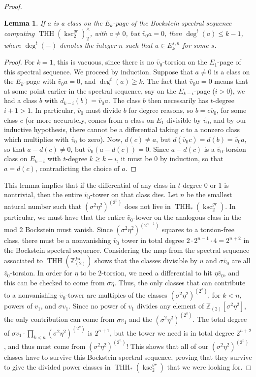 \documentclass[11pt,leqno]{article}
\newcommand{\zz}{\mathbb{Z}}
\DeclareMathOperator{\THH}{THH}
\DeclareMathOperator{\ksc}{ksc}
\newtheorem*{short hand}{theorem name}
\theoremstyle{plain}  %
\newtheorem{lemma}{Lemma}[section]
\theoremstyle{definition}
\numberwithin{equation}{section}
\begin{document}
\begin{proof}
\begin{lemma}\label{lem6.6}
If $a$ is a class on the $E_k$-page of the Bockstein spectral sequence computing $\THH(\ksc_2^{gr})_2^{\wedge}$, with $a\neq 0$, but $\tilde{v_0}a=0$, then $\deg^{t}(a)\leq k-1$, where $\deg^t(-)$ denotes the integer $n$ such that $a\in E_k^{s,n}$ for some $s$.
\end{lemma}
\begin{proof}  For $k=1$, this is vacuous, since there is no $\tilde{v_0}$-torsion on the $E_1$-page of this spectral sequence.  We proceed by induction.  Suppose that $a\neq 0$ is a class on the $E_k$-page with $\tilde{v_0}a=0$, and $\deg^{t}(a)\geq k$.  The fact that $\tilde{v_0}a=0$ means that at some point earlier in the spectral sequence, say on the $E_{k-i}$-page ($i>0$), we had a class $b$ with $d_{k-i}(b)=\tilde{v_0}a$.  The class $b$ then necessarily has $t$-degree $i+1>1$.  In particular, $\tilde{v_0}$ must divide $b$ for degree reasons, so $b=c\tilde{v_0}$, for some class $c$ (or more accurately, comes from a class on $E_1$ divisible by $\tilde{v_0}$, and by our inductive hypothesis, there cannot be a differential taking $c$ to a nonzero class which multiplies with $\tilde{v_0}$ to zero).  Now, $d(c)\neq a$, but $d(\tilde{v_0}c)=d(b)=\tilde{v_0}a$, so that $a-d(c)\neq 0$, but $\tilde{v_0}(a-d(c))=0$.  Since $a-d(c)$ is a $\tilde{v_0}$-torsion class on $E_{k-i}$ with $t$-degree $k\geq k-i$, it must be 0 by induction, so that $a=d(c)$, contradicting the choice of $a$.
\end{proof}
This lemma implies that if the differential of any class in $t$-degree $0$ or $1$ is nontrivial, then the entire $\tilde{v_0}$-tower on that class dies.  Let $n$ be the smallest natural number such that $(\sigma^2\eta^2)^{(2^n)}$ does not live in $\THH_*(\ksc_2^{gr})$.  In particular, we must have that the entire $\tilde{v_0}$-tower on the analogous class in the mod 2 Bockstein must vanish.  Since $(\sigma^2\eta^2)^{(2^{n-1})}$ squares to a torsion-free class, there must be a nonvanishing $\tilde{v_0}$ tower in total degree $2\cdot 2^{n-1}\cdot 4=2^{n+2}$ in the Bockstein spectral sequence.  Considering the map from the spectral sequence associated to $\THH(\zz_{(2)}^{fil})$ shows that the classes divisible by $u$ and $\sigma\tilde{v_0}$ are all $\tilde{v_0}$-torsion.  In order for $\eta$ to be $2$-torsion, we need a differential to hit $\eta\tilde{v_0}$, and this can be checked to come from $\sigma\eta$.  Thus, the only classes that can contribute to a nonvanishing $\tilde{v_0}$-tower are multiples of the classes $(\sigma^2\eta^2)^{(2^k)}$, for $k<n$, powers of $v_1$, and $\sigma v_1$.  Since no power of $v_1$ divides any element of $\zz_{(2)}[\sigma^2\eta^2]$, the only contribution can come from $\sigma v_1$ and the $(\sigma^2\eta^2)^{(2^k)}$.  The total degree of $\sigma v_1\cdot \prod_{k<n}(\sigma^2\eta^2)^{(2^k)}$ is $2^{n+1}$, but the tower we need is in total degree $2^{n+2}$, and thus must come from $(\sigma^2\eta^2)^{(2^n)}$! This shows that all of our $(\sigma^2\eta^2)^{(2^n)}$ classes have to survive this Bockstein spectral sequence, proving that they survive to give the divided power classes in $\THH_*(\ksc_2^{gr})$ that we were looking for.
\end{proof}
\end{document}
